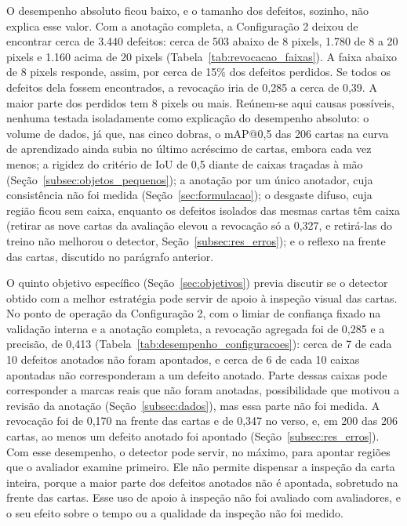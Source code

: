 \documentclass[
    12pt,                %
    openright,           %
    oneside,             %
    a4paper,             %
    english,             %
    brazil               %
]{abntex2}
\begin{document}
O desempenho absoluto ficou baixo, e o tamanho dos defeitos, sozinho, não
explica esse valor. Com a anotação completa, a Configuração 2 deixou de
encontrar cerca de 3.440 defeitos: cerca de 503 abaixo de 8 pixels, 1.780
de 8 a 20 pixels e 1.160 acima de 20 pixels
(Tabela~\ref{tab:revocacao_faixas}). A faixa abaixo de 8 pixels responde,
assim, por cerca de 15\% dos defeitos perdidos. Se todos os defeitos dela
fossem encontrados, a revocação iria de 0,285 a cerca de 0,39. A maior
parte dos perdidos tem 8 pixels ou mais. Reúnem-se aqui causas possíveis,
nenhuma testada isoladamente como explicação do desempenho absoluto: o volume de dados,
já que, nas cinco dobras, o mAP@0,5 das 206 cartas na curva de aprendizado ainda subia no último acréscimo de cartas, embora cada vez menos; a rigidez do
critério de IoU de 0,5 diante de caixas traçadas à mão
(Seção~\ref{subsec:objetos_pequenos}); a anotação por um único anotador,
cuja consistência não foi medida (Seção~\ref{sec:formulacao}); o desgaste
difuso, cuja região ficou sem caixa, enquanto os defeitos isolados das
mesmas cartas têm caixa (retirar as nove cartas da avaliação elevou a revocação só a
0,327, e retirá-las do treino não melhorou o detector, Seção~\ref{subsec:res_erros}); e o reflexo na
frente das cartas, discutido no parágrafo anterior.

O quinto objetivo específico (Seção~\ref{sec:objetivos}) previa
discutir se o detector obtido com a melhor estratégia pode servir de
apoio à inspeção visual das cartas. No ponto de operação da
Configuração 2, com o limiar de confiança fixado na validação interna
e a anotação completa, a revocação agregada foi de 0,285 e a precisão,
de 0,413 (Tabela~\ref{tab:desempenho_configuracoes}): cerca de 7 de
cada 10 defeitos anotados não foram apontados, e cerca de 6 de cada 10
caixas apontadas não corresponderam a um defeito anotado. Parte dessas
caixas pode corresponder a marcas reais que não foram anotadas,
possibilidade que motivou a revisão da anotação
(Seção~\ref{subsec:dados}), mas essa parte não foi medida. A revocação
foi de 0,170 na frente das cartas e de 0,347 no verso, e, em 200 das
206 cartas, ao menos um defeito anotado foi apontado
(Seção~\ref{subsec:res_erros}). Com esse desempenho, o detector
pode servir, no máximo, para apontar regiões que o avaliador examine
primeiro. Ele não permite dispensar a inspeção da carta inteira, porque
a maior parte dos defeitos anotados não é apontada, sobretudo na frente
das cartas. Esse uso de apoio à inspeção não foi avaliado com
avaliadores, e o seu efeito sobre o tempo ou a qualidade da inspeção
não foi medido.
\end{document}
